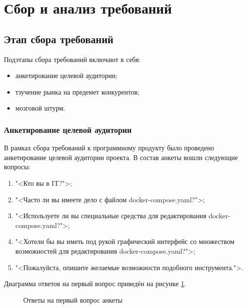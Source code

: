 \section{Сбор и анализ требований}

\vspace{-0.9cm}

\subsection{Этап сбора требований}

\label{req:sect_1}

Подэтапы сбора требований включают в себя:

\begin{itemize}[wide]
    \item анкетирование целевой аудитории;
    \item тзучение рынка на предемет конкурентов;
    \item мозговой штурм.
\end{itemize}

\subsubsection{Анкетирование целевой аудитории}

В рамках сбора требований к программному продукту было проведено анкетирование целевой аудитории проекта. В состав анкеты вошли следующие вопросы:

\begin{enumerate}
    \item "<Кто вы в IT?">;
    \item "<Часто ли вы имеете дело с файлом docker-compose.yaml?">;
    \item "<Используете ли вы специальные средства для редактирования docker-compose.yaml?">;
    \item "<Хотели бы вы иметь под рукой графический интерфейс со множеством возможностей для редактирования docker-compose.yaml?">;
    \item "<Пожалуйста, опишите желаемые возможности подобного инструмента.">.
\end{enumerate}

Диаграмма ответов на первый вопрос приведён на рисунке \ref{req:first_q}.

\begin{figure}[H]
        \caption{Ответы на первый вопрос анкеты}
        \label{req:first_q}
\end{figure}


